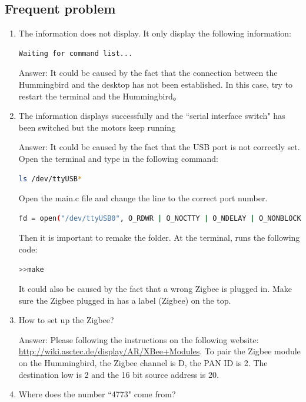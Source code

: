 \documentclass[idxtotoc,hyperref,openany]{labbook} %
\begin{document}
\subsection{Frequent problem}
\begin{enumerate}
\item The information does not display. It only display the following information:
\begin{lstlisting}[language=bash]
Waiting for command list...
\end{lstlisting}

Answer: It could be caused by the fact that the connection between the Hummingbird and the desktop has not been established. In this case, try to restart the terminal and the Hummingbird。
\item The information displays successfully and  the ``serial interface switch" has been switched but the motors keep running

Answer: It could be caused by the fact that the USB port is not correctly set. Open the terminal and type in the following command:
\begin{lstlisting}[language=bash]
ls /dev/ttyUSB*
\end{lstlisting}

Open the main.c file and change the line to the correct port number. 

\begin{lstlisting}[language=bash]
fd = open("/dev/ttyUSB0", O_RDWR | O_NOCTTY | O_NDELAY | O_NONBLOCK);
\end{lstlisting}

Then it is important to remake the folder. At the terminal, runs the following code:
\begin{lstlisting}[language=bash]
>>make
\end{lstlisting}


It could also be caused by the fact that a wrong Zigbee is plugged in. Make sure the Zigbee plugged in has a label (Zigbee) on the top. 

\item How to set up the Zigbee?

Answer: Please following the instructions on the following website: \url{http://wiki.asctec.de/display/AR/XBee+Modules}. To pair the Zigbee module on the Hummingbird, the Zigbee channel is D, the PAN ID is 2. The destination low is 2 and the 16 bit source address is 20. 

\item Where does the number ``4773" come from?


\end{enumerate}
\end{document}
